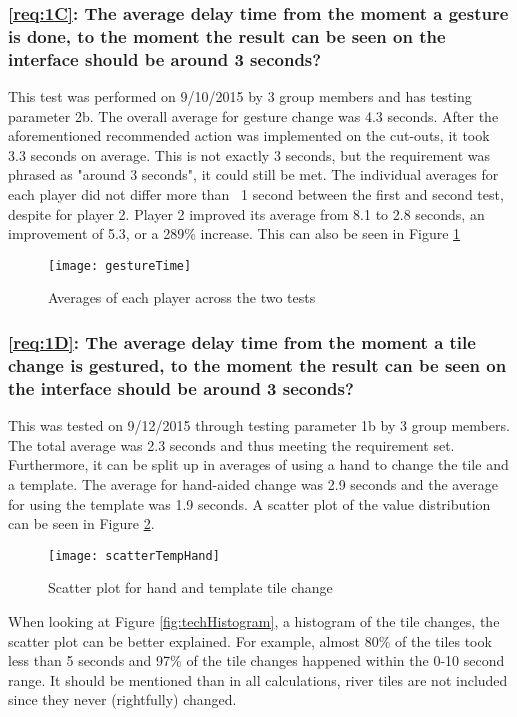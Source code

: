 	\subsubsection*{\ref{req:1C}: The average delay time from the moment a gesture is done, to the moment the result can be seen on the interface should be around 3 seconds?}
	This test was performed on 9/10/2015 by 3 group members and has testing parameter 2b. The overall average for gesture change was 4.3 seconds. After the aforementioned recommended action was implemented on the cut-outs, it took 3.3 seconds on average. This is not exactly 3 seconds, but the requirement was phrased as "around 3 seconds", it could still be met. The individual averages for each player did not differ more than ~1 second between the first and second test, despite for player 2. Player 2 improved its average from 8.1 to 2.8 seconds, an improvement of 5.3, or a 289\% increase. This can also be seen in Figure \ref{fig:techGestureTime}
	
\begin{figure}[h!]
	\centering
	\texttt{[image: gestureTime]}
	\caption{Averages of each player across the two tests} 
	\label{fig:techGestureTime}
\end{figure}

	\subsubsection*{\ref{req:1D}: The average delay time from the moment a tile change is gestured, to the moment the result can be seen on the interface should be around 3 seconds?}
	This was tested on 9/12/2015 through testing parameter 1b by 3 group members. The total average was 2.3 seconds and thus meeting the requirement set. Furthermore, it can be split up in averages of using a hand to change the tile and a template. The average for hand-aided change was 2.9 seconds and the average for using the template was 1.9 seconds. A scatter plot of the value distribution can be seen in Figure \ref{fig:techScatter1}.
	
\begin{figure}[h!]
	\centering
	\texttt{[image: scatterTempHand]}
	\caption{Scatter plot for hand and template tile change} 
	\label{fig:techScatter1}
\end{figure}

When looking at Figure \ref{fig:techHistogram}, a histogram of the tile changes, the scatter plot can be better explained. For example, almost 80\% of the tiles took less than 5 seconds and 97\% of the tile changes happened within the 0-10 second range. It should be mentioned than in all calculations, river tiles are not included since they never (rightfully) changed. 

